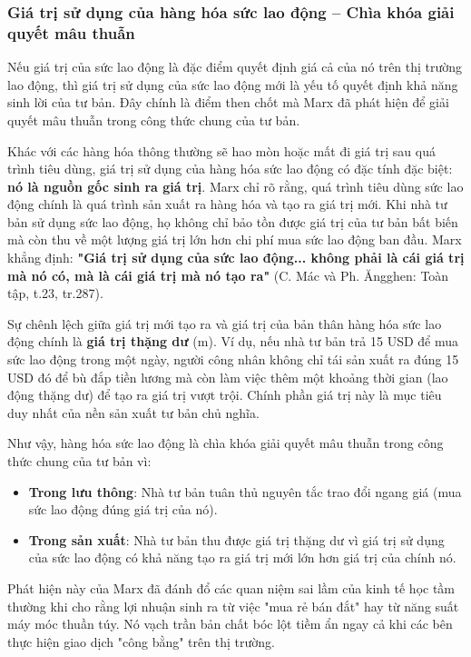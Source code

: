 \subsubsection{Giá trị sử dụng của hàng hóa sức lao động – Chìa khóa giải quyết mâu thuẫn}
Nếu giá trị của sức lao động là đặc điểm quyết định giá cả của nó trên thị trường lao động, thì giá trị sử dụng của sức lao động mới là yếu tố quyết định khả năng sinh lời của tư bản. Đây chính là điểm then chốt mà Marx đã phát hiện để giải quyết mâu thuẫn trong công thức chung của tư bản.

Khác với các hàng hóa thông thường sẽ hao mòn hoặc mất đi giá trị sau quá trình tiêu dùng, giá trị sử dụng của hàng hóa sức lao động có đặc tính đặc biệt: \textbf{nó là nguồn gốc sinh ra giá trị}. Marx chỉ rõ rằng, quá trình tiêu dùng sức lao động chính là quá trình sản xuất ra hàng hóa và tạo ra giá trị mới. Khi nhà tư bản sử dụng sức lao động, họ không chỉ bảo tồn được giá trị của tư bản bất biến mà còn thu về một lượng giá trị lớn hơn chi phí mua sức lao động ban đầu. Marx khẳng định: \textbf{"Giá trị sử dụng của sức lao động... không phải là cái giá trị mà nó có, mà là cái giá trị mà nó tạo ra"} (C. Mác và Ph. Ăngghen: Toàn tập, t.23, tr.287).

Sự chênh lệch giữa giá trị mới tạo ra và giá trị của bản thân hàng hóa sức lao động chính là \textbf{giá trị thặng dư} (m). Ví dụ, nếu nhà tư bản trả 15 USD để mua sức lao động trong một ngày, người công nhân không chỉ tái sản xuất ra đúng 15 USD đó để bù đắp tiền lương mà còn làm việc thêm một khoảng thời gian (lao động thặng dư) để tạo ra giá trị vượt trội. Chính phần giá trị này là mục tiêu duy nhất của nền sản xuất tư bản chủ nghĩa.

Như vậy, hàng hóa sức lao động là chìa khóa giải quyết mâu thuẫn trong công thức chung của tư bản vì:
\begin{itemize}
    \item \textbf{Trong lưu thông}: Nhà tư bản tuân thủ nguyên tắc trao đổi ngang giá (mua sức lao động đúng giá trị của nó).
    \item \textbf{Trong sản xuất}: Nhà tư bản thu được giá trị thặng dư vì giá trị sử dụng của sức lao động có khả năng tạo ra giá trị mới lớn hơn giá trị của chính nó.
\end{itemize}
Phát hiện này của Marx đã đánh đổ các quan niệm sai lầm của kinh tế học tầm thường khi cho rằng lợi nhuận sinh ra từ việc "mua rẻ bán đắt" hay từ năng suất máy móc thuần túy. Nó vạch trần bản chất bóc lột tiềm ẩn ngay cả khi các bên thực hiện giao dịch "công bằng" trên thị trường.

